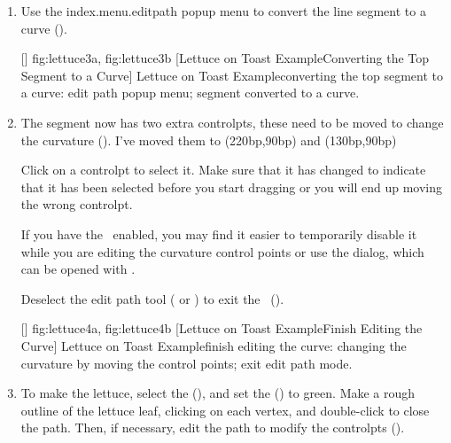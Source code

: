 \begin{enumerate}
[]
{
 {fig:lettuce2a}{}{},
 {fig:lettuce2b}{}{}
}
[Lettuce on Toast Example\dash Editing the Rectangle]
{Lettuce on Toast Example\dash editing the rectangle:
 edit mode;
 select top segment.}

\item Use the \gls{index.menu.editpath} popup menu to convert the line segment to a
curve ().

[]
{
  {fig:lettuce3a}{}{},
  {fig:lettuce3b}{}{}
}
[Lettuce on Toast Example\dash Converting the Top Segment to a Curve]
{Lettuce on Toast Example\dash converting the top segment to
a curve:
 edit path popup menu;
 segment converted to a curve.}

\item The segment now has two extra
\glspl{controlpt}, these need to be moved
to change the curvature ().
I've moved them to (220\gls{bp},90\gls{bp}) and
(130\gls{bp},90\gls{bp})

\begin{information}
Click on a \gls{controlpt} to select it. Make sure that it has
changed  to indicate that it has been selected
before you start dragging or you will end up moving the wrong \gls{controlpt}.
\end{information}

If you have the \gridlock\ enabled, you may find it easier to
temporarily disable it while you are editing the curvature control
points or use the  dialog, which can be opened with
.

Deselect the edit path tool ( or
) to exit
the \editpathmode\ ().

[]
{
 {fig:lettuce4a}{}{},
 {fig:lettuce4b}{}{}
}
[Lettuce on Toast Example\dash Finish Editing the Curve]
{Lettuce on Toast Example\dash finish editing the curve:
 changing the curvature by moving the control points;
 exit edit path mode.}

\item To make the lettuce, select the 
(), and set the 
() to green.  Make a rough outline of the
lettuce leaf, clicking on each vertex, and double-click to close the
path. Then, if necessary, edit the path to modify the
\glspl{controlpt} ().


\end{enumerate}
